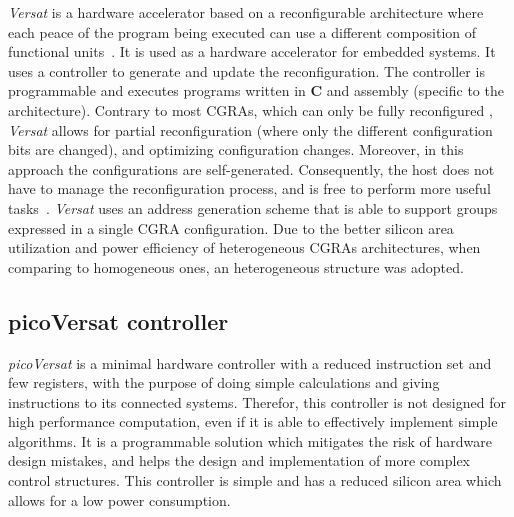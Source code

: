 \documentclass[journal]{IEEEtran}
\begin{document}
{\it Versat} is a hardware accelerator based on a reconfigurable architecture
where each peace of the program being executed can use a different composition
of functional units~\cite{deSousa12}.  It is used as a hardware accelerator for
embedded systems.  It uses a controller to generate and update the
reconfiguration.  The controller is programmable and executes programs written
in {\bf C} and assembly (specific to the architecture).  Contrary to most {\sc
  CGRA}s, which can only be fully reconfigured , {\it Versat} allows for partial
reconfiguration (where only the different configuration bits are changed), and
optimizing configuration changes.  Moreover, in this approach the configurations
are self-generated. Consequently, the host does not have to manage the
reconfiguration process, and is free to perform more useful
tasks~\cite{Lopes2017}.  {\it Versat} uses an address generation scheme that is
able to support groups expressed in a single {\sc CGRA} configuration.  Due to
the better silicon area utilization and power efficiency of heterogeneous {\sc
  CGRA}s architectures, when comparing to homogeneous ones, an heterogeneous
structure was adopted.

\subsection{picoVersat controller} %
\label{section:picoversat}

{\it picoVersat} is a minimal hardware controller with a reduced instruction set
and few registers, with the purpose of doing simple calculations and giving
instructions to its connected systems. Therefor, this controller is not designed
for high performance computation, even if it is able to effectively implement
simple algorithms.  It is a programmable solution which mitigates the risk of
hardware design mistakes, and helps the design and implementation of more
complex control structures.  This controller is simple and has a reduced silicon
area which allows for a low power consumption.
\end{document}
